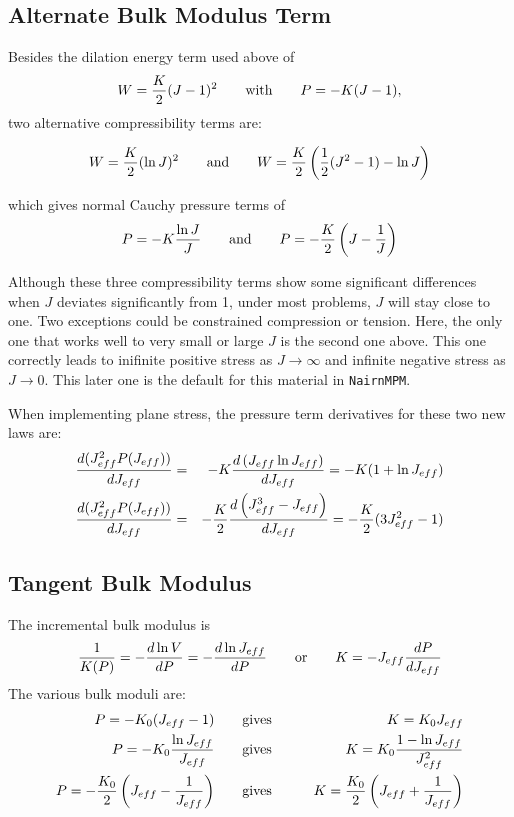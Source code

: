 \documentclass[11pt]{book}
\def\Jeff{J_{eff}}
\begin{document}
\subsection{Alternate Bulk Modulus Term\label{PTerms}}

Besides the dilation energy term used above of
\begin{equation}
W = {K\over2}(J-1)^2  \qquad{\rm with}\qquad P = -K (J-1),
\end{equation}
two alternative compressibility terms are:

\begin{equation}
W = {K\over2}(\ln J)^2  \qquad{\rm and}\qquad W = {K\over2}\left({1\over2}(J^2-1) - \ln J\right)
\end{equation}

\noindent which gives normal Cauchy pressure terms of
\begin{equation}
     P = -K {\ln J\over J}  \qquad{\rm and}\qquad P = - {K\over 2}\left(J-{1\over J}\right)
\end{equation}

\noindent Although these three compressibility terms show some significant differences when $J$ deviates significantly from 1, under most problems, $J$ will stay close to one. Two exceptions could be constrained compression or tension. Here, the only one that works well to very small or large $J$ is the second one above. This one correctly leads to inifinite positive stress as $J\to\infty$ and infinite negative stress as $J\to0$. This later one is the default for this material in {\tt NairnMPM}.

When implementing plane stress, the pressure term derivatives for these two new laws are:
\begin{eqnarray}
      {d(\Jeff^2 P(\Jeff))\over d\Jeff} & = & -K{d \left(J_{eff}\ln J_{eff}\right)\over dJ_{eff}} = -K(1+\ln J_{eff}) \\
      {d(\Jeff^2 P(\Jeff))\over d\Jeff} & = & -{K\over 2}{d \left(J_{eff}^3 - J_{eff}\right)\over dJ_{eff}} =  -{K\over 2}(3J_{eff}^2-1)
\end{eqnarray}

\subsection{Tangent Bulk Modulus}

The incremental bulk modulus is
\begin{equation}
   {1\over K(P)} = - {d\ln V\over dP} = - {d\ln \Jeff\over dP}  \qquad{\rm or} \qquad K = -\Jeff {dP\over d\Jeff}
\end{equation}
The various bulk moduli are:
\begin{eqnarray}
   P = -K_0(\Jeff-1) &\qquad{\rm gives}\qquad & K = K_0 \Jeff \\
   P = -K_0 {\ln \Jeff\over \Jeff} &\qquad{\rm gives}\qquad& K = K_0{1-\ln \Jeff \over \Jeff ^2}\\
   P = - {K_0\over 2}\left(\Jeff -{1\over \Jeff }\right) &\qquad{\rm gives}\qquad& K = {K_0\over 2}\left(\Jeff  + {1\over \Jeff }\right)
\end{eqnarray}
\end{document}
